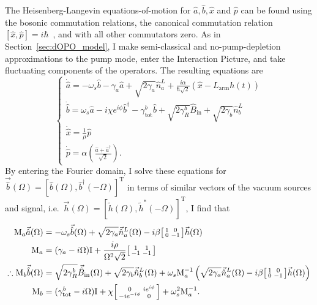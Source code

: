 The Heisenberg-Langevin equations-of-motion for $\hat a, \hat b, \hat x$ and $\hat p$ can be found using the bosonic commutation relations, the canonical commutation relation $[\hat x,\hat p]=i\hbar$~\cite{}, and with all other commutators zero. As in Section~\ref{sec:dOPO_model}, I make semi-classical and no-pump-depletion approximations to the pump mode, enter the Interaction Picture, and take fluctuating components of the operators. The resulting equations are
\begin{equation}\label{eq:dIS_EoM}\begin{cases}
\dot{\hat a}=-\omega_s \hat b- \gamma_a \hat{a} + \sqrt{2\gamma_a}\hat{n}^L_a+\frac{i \alpha}{\hbar\sqrt2}(\hat{x}-L_\mathrm{arm}h(t)) \\
\dot{\hat b}=\omega_s \hat a-i\chi e^{i\phi} \hat b^\dag - \gamma^b_\mathrm{tot} \hat{b} + \sqrt{2\gamma^b_R}\hat{B}_\mathrm{in} + \sqrt{2\gamma_b}\hat{n}^L_b\\
\dot{\hat x}=\frac{1}{\mu}\hat p\\
\dot{\hat p}=\alpha\left(\frac{\hat{a}+\hat{a}^\dag}{\sqrt{2}}\right).
\end{cases}\end{equation}
By entering the Fourier domain, I solve these equations for $\vec{\hat b}(\Omega)=[\hat b(\Omega),\hat b^\dag(-\Omega)]^\text{T}$ in terms of similar vectors of the vacuum sources and signal, i.e.\ $\vec h(\Omega)=[\tilde h(\Omega),\tilde h^*(-\Omega)]^\text{T}$, I find that
\begin{align}
\text{M}_a\vec{\hat a}(\Omega)&=-\omega_s\vec{\hat b}(\Omega) + \sqrt{2\gamma_a}\vec{\hat n}^L_a(\Omega)-i\beta\begin{bsmallmatrix}1 & 0 \\0 & -1\end{bsmallmatrix}\vec h(\Omega) \\
\text{M}_a&= (\gamma_a-i \Omega)\text{I}+\frac{i \rho}{\Omega^2 \sqrt 2}\begin{bsmallmatrix}1 & 1 \\-1 & -1\end{bsmallmatrix} \\
\therefore\text{M}_b\vec{\hat b}(\Omega)&=\sqrt{2\gamma^b_R}\vec{\hat B}_\mathrm{in}(\Omega) + \sqrt{2\gamma_b}\vec{\hat n}^L_b(\Omega)+\omega_s \text{M}_a^{-1}\left(\sqrt{2\gamma_a}\vec{\hat n}^L_a(\Omega)-i\beta\begin{bsmallmatrix}1 & 0 \\0 & -1\end{bsmallmatrix}\vec h(\Omega)\right)\\
\text{M}_b&= (\gamma^b_\mathrm{tot}-i \Omega)\text{I}+\chi \begin{bsmallmatrix}0 & i e^{i\phi}\\-i e^{-i\phi} & 0\end{bsmallmatrix}+\omega_s^2\text{M}_a^{-1}.
\end{align}
